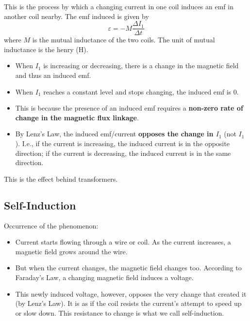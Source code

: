 \documentclass[a4paper,12pt]{article}
\begin{document}
This is the process by which a changing current in one coil induces an emf in another coil nearby. The emf induced is given by $$\varepsilon = -M\frac{\Delta I_1}{\Delta t}$$where $M$ is the mutual inductance of the two coils. The unit of mutual inductance is the henry (H).
\begin{itemize}
  \item When $I_1$ is increasing or decreasing, there is a change in the magnetic field and thus an induced emf.
  \item When $I_1$ reaches a constant level and stops changing, the induced emf is 0.
  \item This is because the presence of an induced emf requires a \textbf{non-zero rate of change in the magnetic flux linkage}.
  \item By Lenz's Law, the induced emf/current \textbf{opposes the change in $I_1$} (not $I_1$). I.e., if the current is increasing, the induced current is in the opposite direction; if the current is decreasing, the induced current is in the same direction.
\end{itemize}
This is the effect behind transformers.

\subsection{Self-Induction}

Occurrence of the phenomenon:
\begin{itemize}
  \item Current starts flowing through a wire or coil.
        As the current increases, a magnetic field grows around the wire.
  \item But when the current changes, the magnetic field changes too. According to Faraday's Law, a changing magnetic field induces a voltage.
  \item This newly induced voltage, however, opposes the very change that created it (by Lenz's Law). It is as if the coil resists the current's attempt to speed up or slow down. This resistance to change is what we call self-induction.
\end{itemize}
\end{document}
